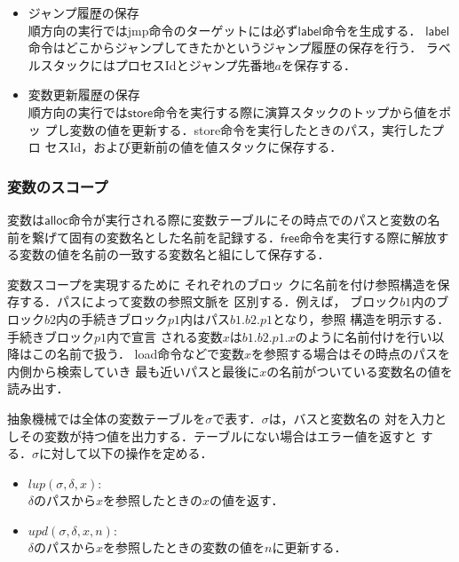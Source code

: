 \documentclass[submit,PRO]{ipsj}
\newcommand{\bcode}[1]{$\mathsf{#1}$}
\begin{document}
\begin{itemize}
 \item ジャンプ履歴の保存\\
順方向の実行ではjmp命令のターゲットには必ず\bcode{label}命令を生成する．
\bcode{label}命令はどこからジャンプしてきたかというジャンプ履歴の保存を行う．
ラベルスタックにはプロセスIdとジャンプ先番地$a$を保存する．
\item 変数更新履歴の保存\\
順方向の実行では\bcode{store}命令を実行する際に演算スタックのトップから値をポッ
プし変数の値を更新する．store命令を実行したときのパス，実行したプロ
セスId，および更新前の値を値スタックに保存する．
\end{itemize}

\subsubsection{変数のスコープ}

変数は\bcode{alloc}命令が実行される際に変数テーブルにその時点でのパスと変数の名
前を繋げて固有の変数名とした名前を記録する．\bcode{free}命令を実行する際に解放す
る変数の値を名前の一致する変数名と組にして保存する．

変数スコープを実現するために
それぞれのブロッ
クに名前を付け参照構造を保存する．パスによって変数の参照文脈を
区別する．例えば，
ブロック$b1$内のブロック$b2$内の手続きブロック$p1$内はパス$b1.b2.p1$となり，参照
構造を明示する．手続きブロック$p1$内で宣言
される変数$x$は$b1.b2.p1.x$のように名前付けを行い以降はこの名前で扱う．
load命令などで変数$x$を参照する場合はその時点のパスを内側から検索していき
最も近いパスと最後に$x$の名前がついている変数名の値を読み出す．

抽象機械では全体の変数テーブルを$\sigma$で表す．$\sigma$は，バスと変数名の
対を入力としその変数が持つ値を出力する．テーブルにない場合はエラー値を返すと
する．$\sigma$に対して以下の操作を定める．
\begin{itemize}
 \item $lup(\sigma,\delta,x)$:\\
$\delta$のパスから$x$を参照したときの$x$の値を返す．


 \item $upd(\sigma,\delta,x,n)$:\\
$\delta$のパスから$x$を参照したときの変数の値を$n$に更新する．
\end{itemize}
\end{document}
